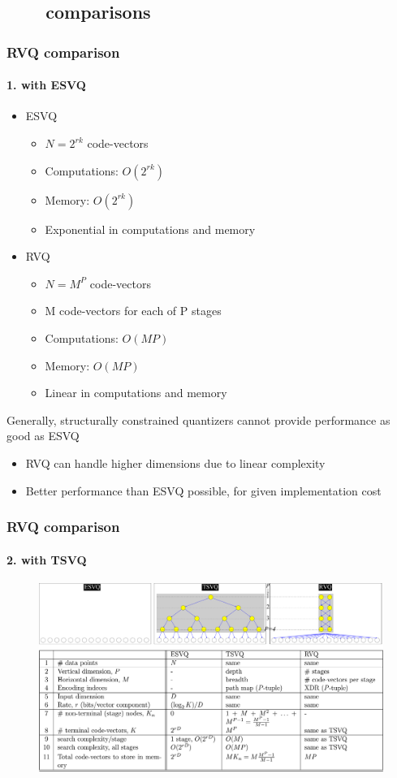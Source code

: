 \subsection{\ \ \ \ comparisons}
\begin{frame}
\frametitle{RVQ comparison}\logoCSIPCPL\mypagenum
\framesubtitle{1. with ESVQ}
	\begin{itemize}
		\item ESVQ
			\begin{itemize}
				\item $N=2^{rk}$ code-vectors
				\item Computations: $O(2^{rk})$
				\item Memory: $O(2^{rk})$
				\item Exponential in computations and memory
			\end{itemize}
		\item RVQ
			\begin{itemize}
				\item $N={M^P}$ code-vectors
				\item M code-vectors for each of P stages
				\item Computations: $O(MP)$
				\item Memory: $O(MP)$
				\item Linear in computations and memory
			\end{itemize}
	\end{itemize}
	Generally, structurally constrained quantizers cannot provide performance as good as ESVQ
	\begin{itemize}
		\item RVQ can handle higher dimensions due to linear complexity
		\item Better performance than ESVQ possible, for given implementation cost
	\end{itemize}	
\end{frame}


\begin{frame}[plain]
\frametitle{RVQ comparison}
\framesubtitle{2. with TSVQ}
\logoCSIPCPL\mypagenum
	\begin{changemargin}{-1.3in}{0in}
		\begin{figure}				
			\includegraphics[width=1.3\textwidth]{figs/RVQ_comparisonWithESVQ_TSVQ.pdf}
		\end{figure}
	\end{changemargin}
\end{frame}



